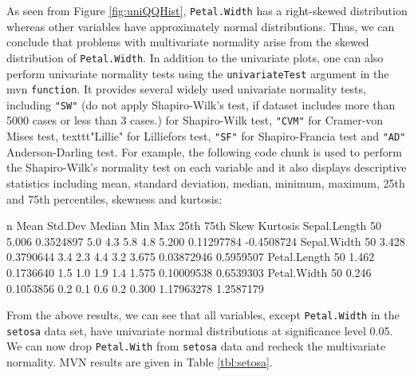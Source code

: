 \documentclass[11pt]{article}
\begin{document}
As seen from Figure \ref{fig:uniQQHist}, \texttt{Petal.Width} has a right-skewed distribution whereas other variables have approximately normal distributions. Thus, we can conclude that problems with multivariate normality arise from the skewed distribution of \texttt{Petal.Width}. In addition to the univariate plots, one can also perform univariate normality tests using the \texttt{univariateTest} argument in the mvn \texttt{function}. It provides several widely used univariate normality tests, including \texttt{"SW"} (do not apply Shapiro-Wilk's test, if dataset includes more than 5000 cases or less than 3 cases.) for Shapiro-Wilk test, \texttt{"CVM"} for Cramer-von Mises test, texttt{"Lillie"} for Lilliefors test,  \texttt{"SF"} for Shapiro-Francia test and  \texttt{"AD"} Anderson-Darling test. For example, the following code chunk is used to perform the Shapiro-Wilk's normality test on each variable and it also displays descriptive statistics including mean, standard deviation, median, minimum, maximum, 25th and 75th percentiles, skewness and kurtosis:

\begin{Schunk}
\end{Schunk}

\begin{Schunk}
\begin{Soutput}
              n  Mean   Std.Dev Median Min Max 25th  75th       Skew   Kurtosis
Sepal.Length 50 5.006 0.3524897    5.0 4.3 5.8  4.8 5.200 0.11297784 -0.4508724
Sepal.Width  50 3.428 0.3790644    3.4 2.3 4.4  3.2 3.675 0.03872946  0.5959507
Petal.Length 50 1.462 0.1736640    1.5 1.0 1.9  1.4 1.575 0.10009538  0.6539303
Petal.Width  50 0.246 0.1053856    0.2 0.1 0.6  0.2 0.300 1.17963278  1.2587179
\end{Soutput}
\end{Schunk}

From the above results, we can see that all variables, except \texttt{Petal.Width} in the \texttt{setosa} data set, have univariate normal distributions at significance level 0.05. We can now drop \texttt{Petal.With} from \texttt{setosa} data and recheck the multivariate normality. MVN results are given in Table \ref{tbl:setosa}.
\end{document}
